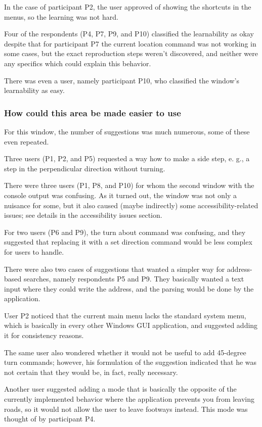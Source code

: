 \documentclass[nolof,digital]{fithesis3}
\begin{document}
In the case of participant P2, the user approved of showing the shortcuts in the menus, so the learning was not hard.

Four of the respondents (P4, P7, P9, and P10) classified the learnability as okay despite that for participant P7 the current location command was not working in some cases, but the exact reproduction steps weren't discovered, and neither were any specifics which could explain this behavior.

There was even a user, namely participant P10, who classified the window's learnability as easy.
\subsubsection{How could this area be made easier to use}
For this window, the number of suggestions was much numerous, some of these even repeated.

Three users (P1, P2, and P5) requested a way how to make a side step, e. g., a step in the perpendicular direction without turning.

There were three users (P1, P8, and P10) for whom the second window with the console output was confusing. As it turned out, the window was not only a nuisance for some, but it also caused (maybe indirectly) some accessibility-related issues; see details in the accessibility issues section.

For two users (P6 and P9), the turn about command was confusing, and they suggested that replacing it with a set direction command would be less complex for users to handle.

There were also two cases of suggestions that wanted a simpler way for address-based searches, namely respondents P5 and P9. They basically wanted a text input where they could write the address, and the parsing would be done by the application.

User P2 noticed that the current main menu lacks the standard system menu, which is basically in every other Windows GUI application, and suggested adding it for consistency reasons.

The same user also wondered whether it would not be useful to add 45-degree turn commands; however, his formulation of the suggestion indicated that he was not certain that they would be, in fact, really necessary.

Another user suggested adding a mode that is basically the opposite of the currently implemented behavior where the application prevents you from leaving roads, so it would not allow the user to leave footways instead. This mode was thought of by participant P4.
\end{document}
